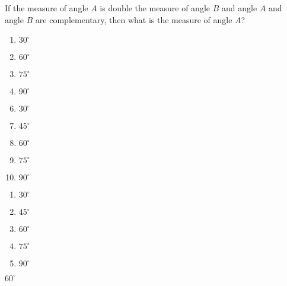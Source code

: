 


  If the measure of angle $A$ is double the measure of angle $B$ and angle $A$ and angle $B$ are complementary, then what is the measure of angle $A$?


\ifsat
	\begin{enumerate}[label=\Alph*)]
		\item   $30^\circ$
		\item $60^\circ$%
		\item $75^\circ$
		\item  $90^\circ$
	\end{enumerate}
\else
\fi

\ifacteven
	\begin{enumerate}[label=\textbf{\Alph*.},itemsep=\fill,align=left]
		\setcounter{enumii}{5}
		\item   $30^\circ$
		\item  $45^\circ$
		\item $60^\circ$%
		\addtocounter{enumii}{1}
		\item $75^\circ$
		\item  $90^\circ$
	\end{enumerate}
\else
\fi

\ifactodd
	\begin{enumerate}[label=\textbf{\Alph*.},itemsep=\fill,align=left]
		\item   $30^\circ$
		\item  $45^\circ$
		\item $60^\circ$%
		\item $75^\circ$
		\item  $90^\circ$
	\end{enumerate}
\else
\fi

\ifgridin
 $60^\circ$%
		
\else
\fi

